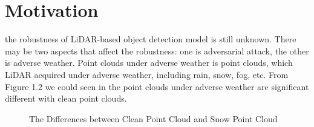 \section{Motivation}
the robustness of LiDAR-based object detection model is still unknown. There may be two aspects that affect the robustness: one is adversarial attack, the other is adverse weather. Point clouds under adverse weather is point clouds, which LiDAR acquired under adverse weather, including rain, snow, fog, etc. From Figure 1.2 we could seen in the point clouds under adverse weather are significant different with clean point clouds. 
\begin{figure}[!htbp]
    \centering
    \hspace{10pt}
    \caption[Short Description for List of Figures]{The Differences between Clean Point Cloud and Snow Point Cloud}
    \label{fig:logo1and2}
\end{figure}

